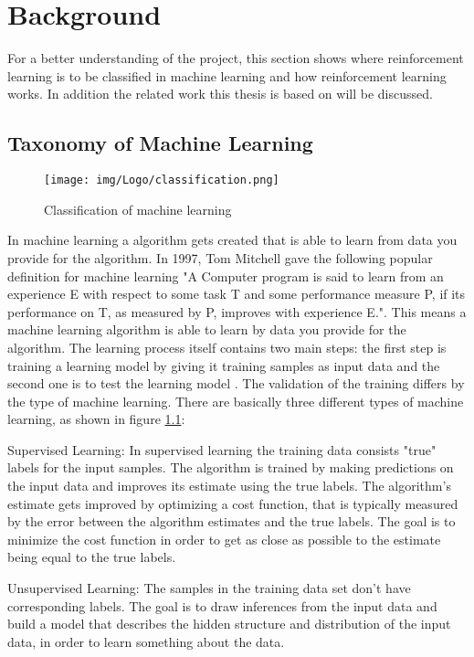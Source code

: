 \chapter{Background}

For a better understanding of the project, this section shows where reinforcement learning is to be classified in machine learning and how reinforcement learning works. In addition the related work this thesis is based on will be discussed.

\section{Taxonomy of Machine Learning}

\begin{figure} 
	\centering
	\texttt{[image: img/Logo/classification.png]}
	\caption{Classification of machine learning}
	\label{fig:classifi}
\end{figure}

In machine learning a algorithm gets created that is able to learn from data you provide for the algorithm.
In 1997, Tom Mitchell gave the following popular definition for machine learning "A Computer program is said to learn from an experience E with respect to some task T and some performance measure P, if its performance on T, as measured by P, improves with experience E."\cite{shanthamallu2017brief}. This means a machine learning algorithm is able to learn by data you provide for the algorithm. The learning process itself contains two main steps: the first step is training a learning model by giving it training samples as input data and the second one is to test the learning model \cite{nasteski2017overview}. The validation of the training differs by the type of machine learning. There are basically three different types of machine learning, as shown in figure \ref{fig:classifi}:

Supervised Learning: In supervised learning the training data consists "true" labels for the input samples.  The algorithm is trained by  making predictions on the input data and improves its estimate using the true labels. The algorithm's estimate gets improved by optimizing a cost function, that is typically measured by the error between the algorithm estimates and the true labels.  The goal is to minimize the cost function in order to get as close as possible to the estimate being equal to the true labels. \cite{shanthamallu2017brief}

Unsupervised Learning: The samples in the training data set don't have corresponding labels. The goal is to draw inferences from the input data and build a model that describes the hidden structure and distribution of the input data, in order to learn something about the data.\cite{shanthamallu2017brief}

